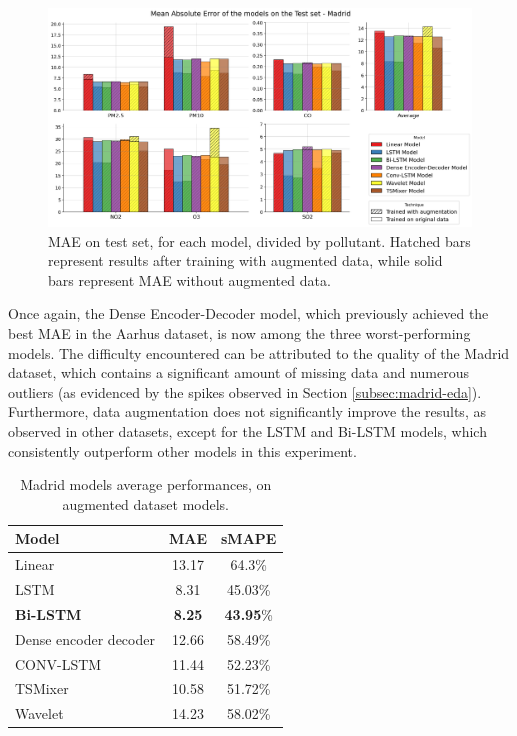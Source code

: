 \begin{figure}[h]
    \centering
    \includegraphics[width=1\linewidth]{images/Madrid_results.png}
    \caption{MAE on test set, for each model, divided by pollutant. Hatched bars represent results after training with augmented data, while solid bars represent MAE without augmented data.}
    \label{fig:madrid_results}
\end{figure}

Once again, the Dense Encoder-Decoder model, which previously achieved the best MAE in the Aarhus dataset, is now among the three worst-performing models.
The difficulty encountered can be attributed to the quality of the Madrid dataset, which contains a significant amount of missing data and numerous outliers (as evidenced by the spikes observed in Section \ref{subsec:madrid-eda}). Furthermore, data augmentation does not significantly improve the results, as observed in other datasets, except for the LSTM and Bi-LSTM models, which consistently outperform other models in this experiment.

\begin{table}[]
    \centering
    \begin{tabular}{lcc}
        \toprule
        \textbf{Model} & \textbf{MAE} & \textbf{sMAPE} \\ 
        \midrule
        Linear & 13.17 & 64.3\% \\
        LSTM & 8.31 & 45.03\% \\
       \textbf{Bi-LSTM}& \textbf{8.25} & \textbf{43.95}\% \\
        Dense encoder decoder & 12.66 & 58.49\% \\
        CONV-LSTM & 11.44 & 52.23\% \\
        TSMixer & 10.58 & 51.72\% \\
        Wavelet & 14.23 & 58.02\% \\ 
        \bottomrule
    \end{tabular}
    \caption{Madrid models average performances, on augmented dataset models.}
    \label{tab:Madrid_performances}
\end{table}

